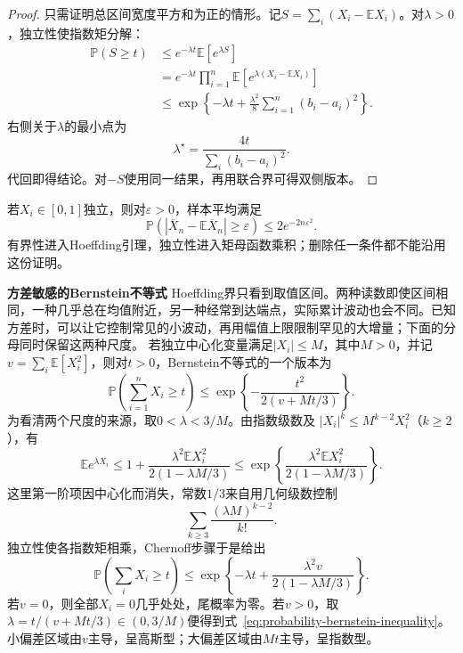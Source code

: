 \begin{proof}
只需证明总区间宽度平方和为正的情形。记\(S=\sum_i(X_i-\mathbb{E}X_i)\)。对\(\lambda>0\)，独立性使指数矩分解：
\[
\begin{aligned}
  \mathbb{P}(S\geq t)
  &\leq
  e^{-\lambda t}\mathbb{E}[e^{\lambda S}]\\
  &=
  e^{-\lambda t}
  \prod_{i=1}^{n}
  \mathbb{E}\left[
    e^{\lambda(X_i-\mathbb{E}X_i)}
  \right]\\
  &\leq
  \exp\left\{
    -\lambda t+
    \frac{\lambda^2}{8}
    \sum_{i=1}^{n}(b_i-a_i)^2
  \right\}.
\end{aligned}
\]
右侧关于\(\lambda\)的最小点为
\[ \lambda^\star
  =\frac{4t}{\sum_i(b_i-a_i)^2}. \]
代回即得结论。对\(-S\)使用同一结果，再用联合界可得双侧版本。
\end{proof}

若\(X_i\in[0,1]\)独立，则对\(\varepsilon>0\)，样本平均满足
\[ \mathbb{P}(|\overline{X}_n-\mathbb{E}\overline{X}_n|
  \geq\varepsilon)\leq 2e^{-2n\varepsilon^2}. \]
有界性进入Hoeffding引理，独立性进入矩母函数乘积；删除任一条件都不能沿用这份证明。

\par\medskip\noindent\textbf{方差敏感的Bernstein不等式}\quad
Hoeffding界只看到取值区间。两种读数即使区间相同，一种几乎总在均值附近，另一种经常到达端点，实际累计波动也会不同。已知方差时，可以让它控制常见的小波动，再用幅值上限限制罕见的大增量；下面的分母同时保留这两种尺度。
若独立中心化变量满足\(|X_i|\leq M\)，其中\(M>0\)，并记\(v=\sum_i\mathbb{E}[X_i^2]\)，则对\(t>0\)，Bernstein不等式的一个版本为
\begin{equation}
  \mathbb{P}\left(\sum_{i=1}^{n}X_i\geq t\right)
  \leq
  \exp\left\{
    -\frac{t^2}{2(v+Mt/3)}
  \right\}.
  \label{eq:probability-bernstein-inequality}
\end{equation}
为看清两个尺度的来源，取\(0<\lambda<3/M\)。由指数级数及
\(|X_i|^k\leq M^{k-2}X_i^2\)（\(k\geq2\)），有
\[
  \mathbb{E}e^{\lambda X_i}
  \leq
  1+\frac{\lambda^2\mathbb{E}X_i^2}
           {2(1-\lambda M/3)}
  \leq
  \exp\left\{
    \frac{\lambda^2\mathbb{E}X_i^2}
         {2(1-\lambda M/3)}
  \right\}.
\]
这里第一阶项因中心化而消失，常数\(1/3\)来自用几何级数控制
\[
  \sum_{k\geq3}\frac{(\lambda M)^{k-2}}{k!}.
\]
独立性使各指数矩相乘，Chernoff步骤于是给出
\[
  \mathbb{P}\left(\sum_iX_i\geq t\right)
  \leq
  \exp\left\{
    -\lambda t+\frac{\lambda^2v}
      {2(1-\lambda M/3)}
  \right\}.
\]
若\(v=0\)，则全部\(X_i=0\)几乎处处，尾概率为零。若\(v>0\)，取\(\lambda=t/(v+Mt/3)\in(0,3/M)\)便得到式~\eqref{eq:probability-bernstein-inequality}。小偏差区域由\(v\)主导，呈高斯型；大偏差区域由\(Mt\)主导，呈指数型。

